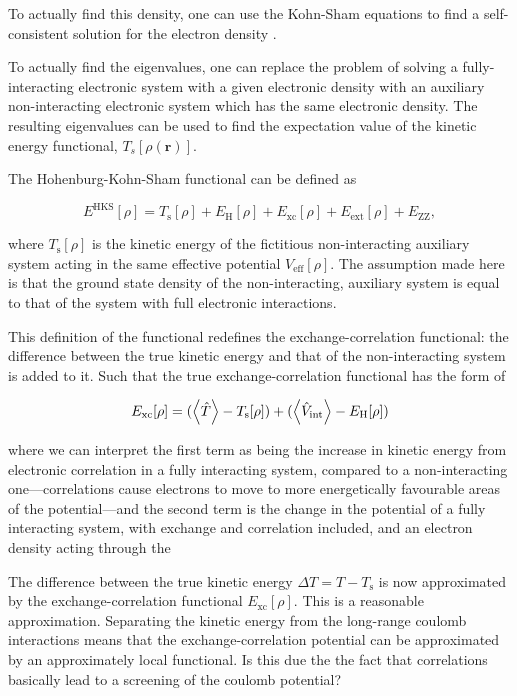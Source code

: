\documentclass[11pt]{article}
\begin{document}
To actually find this density, one can use the Kohn-Sham equations to find a self-consistent
solution for the electron density \cite{kohn65_self_cons_eq}. 




To actually find the eigenvalues, one can replace the problem of solving a fully-interacting
electronic system with a given electronic density with an auxiliary non-interacting electronic
system which has the same electronic density. The resulting eigenvalues can be used to find the
expectation value of the kinetic energy functional, \(T_s[\rho(\mathbf{r})]\).

The Hohenburg-Kohn-Sham functional can be defined as

\[
E^{\text{HKS}}[\rho] = T_{\text{s}}[\rho] + E_{\text{H}}[\rho] + E_{\text{xc}}[\rho] + E_{\text{ext}}[\rho] + E_{\text{ZZ}},
\]

where \(T_{\text{s}}[\rho]\) is the kinetic energy of the fictitious non-interacting auxiliary system
acting in the same effective potential \(V_{\text{eff}}[\rho]\). The assumption made here is that the
ground state density of the non-interacting, auxiliary system is equal to that of the system with
full electronic interactions. 

This definition of the functional redefines the exchange-correlation functional: the difference
between the true kinetic energy and that of the non-interacting system is added to it. Such that the
true exchange-correlation functional has the form of

\[
E_{\text{xc}}[\rho] = ( \expval{\hat{T}} - T_{\text{s}}[\rho] ) + ( \expval{\hat{V}_{\text{int}}} - E_{\text{H}}[\rho])
\]

where we can interpret the first term as being the increase in kinetic energy from electronic
correlation in a fully interacting system, compared to a non-interacting one---correlations cause
electrons to move to more energetically favourable areas of the potential---and the second term is
the change in the potential of a fully interacting system, with exchange and correlation included,
and an electron density acting through the

The difference between the true kinetic energy \(\Delta T = T - T_{\text{s}}\) is now approximated by
the exchange-correlation functional \(E_{\text{xc}}[\rho]\). This is a reasonable
approximation. Separating the kinetic energy from the long-range coulomb interactions means that the
exchange-correlation potential can be approximated by an approximately local functional. Is this due
the the fact that correlations basically lead to a screening of the coulomb potential?
\end{document}
